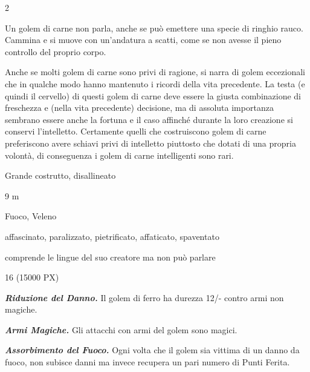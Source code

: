 \begin{multicols}{2}
{Un golem di carne non parla, anche se può emettere una specie di ringhio rauco. Cammina e si muove con un'andatura a scatti, come se non avesse il pieno controllo del proprio corpo.

Anche se molti golem di carne sono privi di ragione, si narra di golem eccezionali che in qualche modo hanno mantenuto i ricordi della vita precedente. La testa (e quindi il cervello) di questi golem di carne deve essere la giusta combinazione di freschezza e (nella vita precedente) decisione, ma di assoluta importanza sembrano essere anche la fortuna e il caso affinché durante la loro creazione si conservi l'intelletto. Certamente quelli che costruiscono golem di carne preferiscono avere schiavi privi di intelletto piuttosto che dotati di una propria volontà, di conseguenza i golem di carne intelligenti sono rari.

\begin{description}[noitemsep, topsep=0pt, parsep=0pt, partopsep=0pt, itemsep=1pt, leftmargin=2.35cm,  labelwidth=2.2cm, itemindent=0cm, listparindent=0pt] %
\setlength{\baselineskip}{10pt}
\item[\textbf{Taglia/Tipo}] Grande costrutto, disallineato
\item[\textbf{Caratt.}] 
\item[\textbf{Punti Ferita}] 
\item[\textbf{Movimento}] 9 m
\item[\textbf{Tiri Salvez.}] 
\item[\textbf{Imm. Danni}] Fuoco, Veleno
\item[\textbf{Immunità}] affascinato, paralizzato, pietrificato, affaticato, spaventato
\item[\textbf{Sensi}] 
\item[\textbf{Linguaggi}] comprende le lingue del suo creatore ma non può parlare
\item[\textbf{Sfida}] 16 (15000 PX)
\end{description}
\smallskip

\emph{\textbf{Riduzione del Danno.}} Il golem di ferro ha durezza 12/- contro armi non magiche.

\emph{\textbf{Armi Magiche.}} Gli attacchi con armi del golem sono magici.

\emph{\textbf{Assorbimento del Fuoco.}} Ogni volta che il golem sia vittima di un danno da fuoco, non subisce danni ma invece recupera un pari numero di Punti Ferita.

}
\end{multicols}
